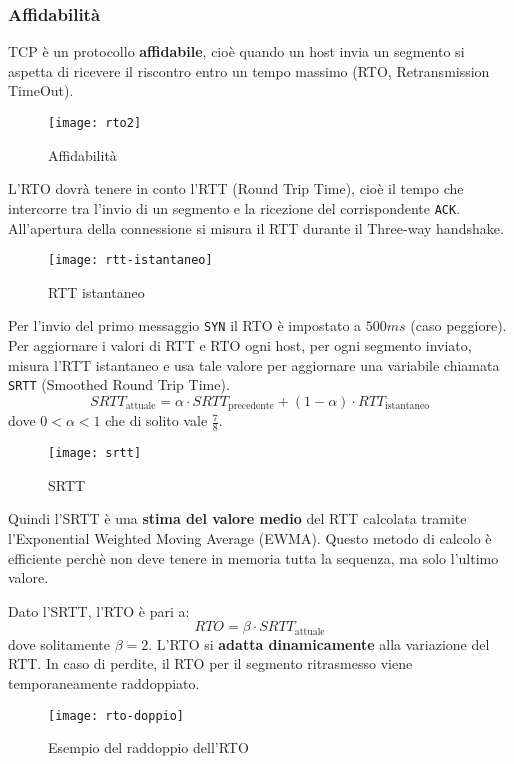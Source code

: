 \documentclass[a4paper]{article}
\begin{document}
\subsubsection{Affidabilità}
TCP è un protocollo \textbf{affidabile}, cioè quando un host invia un segmento si aspetta
di ricevere il riscontro entro un tempo massimo (RTO, Retransmission TimeOut).
\begin{figure}[H]
  \centering
  \texttt{[image: rto2]}
  \caption{Affidabilità}
\end{figure}
\noindent
L'RTO dovrà tenere in conto l'RTT (Round Trip Time), cioè il tempo che intercorre tra
l'invio di un segmento e la ricezione del corrispondente \texttt{ACK}.
All'apertura della connessione si misura il RTT durante il Three-way handshake.
\begin{figure}[H]
  \centering
  \texttt{[image: rtt-istantaneo]}
  \caption{RTT istantaneo}
\end{figure}

\noindent
Per l'invio del primo messaggio \texttt{SYN} il RTO è impostato a \( 500ms \) (caso
peggiore).
Per aggiornare i valori di RTT e RTO ogni host, per ogni segmento inviato, misura 
l'RTT istantaneo e usa tale valore per aggiornare una variabile chiamata \texttt{SRTT}
(Smoothed Round Trip Time).
\[
  SRTT_{\text{attuale}} = \alpha \cdot SRTT_{\text{precedente}} + (1 - \alpha) \cdot
  RTT_{\text{istantaneo}}
\] 
dove \( 0 < \alpha < 1\) che di solito vale \( \frac{7}{8} \).
\begin{figure}[H]
  \centering
  \texttt{[image: srtt]}
  \caption{SRTT}
\end{figure}
\noindent
Quindi l'SRTT è una \textbf{stima del valore medio} del RTT calcolata tramite 
l'Exponential Weighted Moving Average (EWMA). Questo metodo di calcolo è efficiente
perchè non deve tenere in memoria tutta la sequenza, ma solo l'ultimo valore.

\vspace{1em}
\noindent
Dato l'SRTT, l'RTO è pari a:
\[
  RTO = \beta \cdot SRTT_{\text{attuale}}
\] 
dove solitamente \( \beta = 2 \). L'RTO si \textbf{adatta dinamicamente} alla variazione
del RTT. In caso di perdite, il RTO per il segmento ritrasmesso viene temporaneamente
raddoppiato.
\begin{figure}[H]
  \centering
  \texttt{[image: rto-doppio]}
  \caption{Esempio del raddoppio dell'RTO}
\end{figure}
\end{document}
